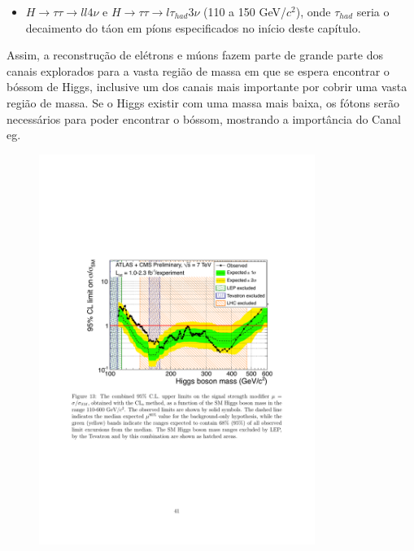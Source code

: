 \begin{itemize} 
\item $H\rightarrow \tau \tau \rightarrow ll4\nu$ e $H\rightarrow \tau \tau
\rightarrow l\tau_{had}3\nu$ (110 a 150 GeV/$c^2$), onde $\tau_{had}$ seria o
decaimento do táon em píons especificados no início deste capítulo.
\end{itemize} 

Assim, a reconstrução de elétrons e múons fazem parte de grande
parte dos canais explorados para a vasta região de massa em que se espera
encontrar o bóssom de Higgs, inclusive um dos canais
mais importante por cobrir uma vasta região de massa. Se o Higgs existir com
uma massa mais baixa, os fótons serão necessários para poder encontrar o bóssom,
mostrando a importância do Canal \gls{eg}. 

\begin{figure}[t!]
    \label{fig:higgs_exclusion}
    \begin{center}
    \includegraphics[width=0.8\textwidth]{imagens/exclusion_cms_atlas.pdf}
%

\end{center}
\end{figure}
